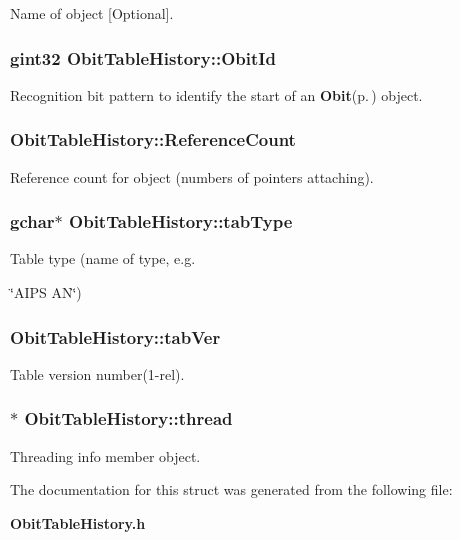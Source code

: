 Name of object [Optional]. 

\subsubsection{\setlength{\rightskip}{0pt plus 5cm}gint32 {\bf Obit\-Table\-History::Obit\-Id}}\label{structObitTableHistory_o0}


Recognition bit pattern to identify the start of an {\bf Obit}{\rm (p.\,\pageref{structObit})} object. 

\subsubsection{ {\bf Obit\-Table\-History::Reference\-Count}}\label{structObitTableHistory_o2}


Reference count for object (numbers of pointers attaching). 

\subsubsection{\setlength{\rightskip}{0pt plus 5cm}gchar$\ast$ {\bf Obit\-Table\-History::tab\-Type}}\label{structObitTableHistory_o12}


Table type (name of type, e.g. 

\char`\"{}AIPS AN\char`\"{}) 
\subsubsection{ {\bf Obit\-Table\-History::tab\-Ver}}\label{structObitTableHistory_o13}


Table version number(1-rel). 

\subsubsection{$\ast$ {\bf Obit\-Table\-History::thread}}\label{structObitTableHistory_o4}


Threading info member object. 



The documentation for this struct was generated from the following file:\begin{CompactItemize}
\item 
{\bf Obit\-Table\-History.h}\end{CompactItemize}

